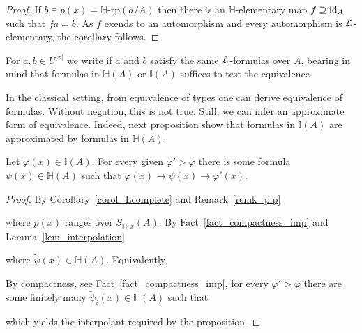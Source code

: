 \documentclass[11pt,oneside]{amsart}
\renewcommand*{\emph}[1]{%
   \smash{\tikz[baseline]\node[rectangle, fill=teal!25, rounded corners, inner xsep=0.5ex, inner ysep=0.2ex, anchor=base, minimum height = 2.7ex]{#1};}}
\begin{document}
\begin{proof}
  If $b\models p(x)=\mathds{H}\mbox{-tp}(a/A)$ then there is an $\mathds{H}$-elementary map $f\supseteq{\rm id}_A$ such that $fa=b$.
  As $f$ exends to an automorphism and every automorphism is ${\EuScript L}$-elementary, the corollary follows.
\end{proof}

For $a,b\in U^{|x|}$ we write \emph{$a\equiv_Ab$\/} if $a$ and $b$ satisfy the same ${\EuScript L}$-formulas over $A$, bearing in mind that formulas in $\mathds{H}(A)$ or $\mathds{I}(A)$ suffices to test the equivalence.

In the classical setting, from equivalence of types one can derive equivalence of formulas.
Without negation, this is not true.
Still, we can infer an approximate form of equivalence.
Indeed, next proposition show that formulas in $\mathds{I}(A)$ are approximated by formulas in $\mathds{H}(A)$.

\begin{proposition}\label{prop_LHapprox1}
  Let $\varphi(x)\in\mathds{I}(A)$.
  For every given $\varphi'>\varphi$ there is some formula $\psi(x)\in\mathds{H}(A)$ such that $\varphi(x)\rightarrow\psi(x)\rightarrow\varphi'(x)$.
\end{proposition}

\begin{proof}
  By Corollary~\ref{corol_Lcomplete} and Remark~\ref{remk_p'p}


  where $p(x)$ ranges over $S_{\mathds{H},x}(A)$.
  By Fact~\ref{fact_compactness_imp} and Lemma~\ref{lem_interpolation}


  where $\tilde{\psi}(x)\in\mathds{H}(A)$.
  Equivalently,


  By compactness, see Fact~\ref{fact_compactness_imp}, for every $\varphi'>\varphi$ there are some finitely many $\tilde{\psi}_i(x)\in\mathds{H}(A)$ such that


  which yields the interpolant required by the proposition.
\end{proof}
\end{document}
